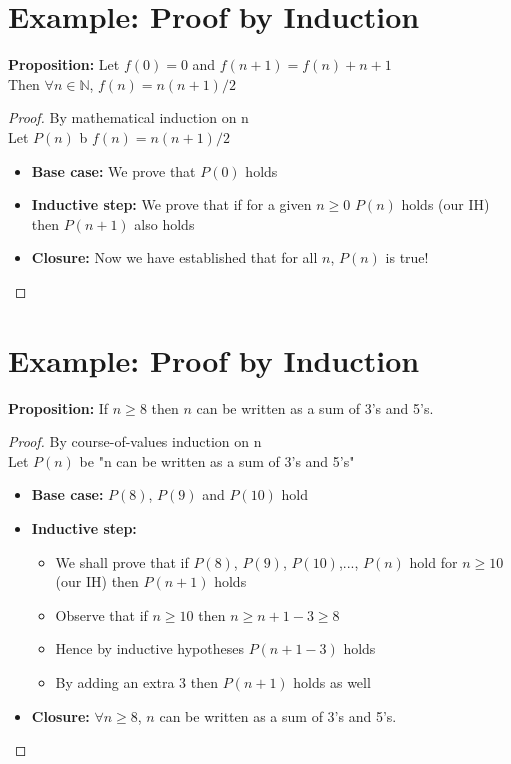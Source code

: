 \section{Example: Proof by Induction} %
\label{sec:example_proof_by_induction}
\textbf{Proposition:} Let $f(0) = 0$ and $f(n+1) = f(n) + n + 1$\\
Then $\forall n \in \mathbb{N}$, $f(n) = n(n+1)/2$
\begin{proof}
    By mathematical induction on n\\
    Let $P(n)$ b $f(n) = n(n + 1)/2$
    \begin{itemize}
        \item \textbf{Base case:} We prove that $P(0)$ holds
        \item \textbf{Inductive step:} We prove that if for a given $n \ge 0$ $P(n)$ holds (our IH) then $P(n + 1)$ also holds
        \item \textbf{Closure:} Now we have established that for all $n$, $P(n)$ is true!
    \end{itemize}
\end{proof}

\section{Example: Proof by Induction} %
\label{sec:example_proof_by_induction2}
\textbf{Proposition:} If $n \ge 8$ then $n$ can be written as a sum of 3's and 5's.
\begin{proof}
    By course-of-values induction on n\\
    Let $P(n)$ be "n can be written as a sum of 3's and 5's"
    \begin{itemize}
        \item \textbf{Base case:} $P(8)$, $P(9)$ and $P(10)$ hold
        \item \textbf{Inductive step:}
        \begin{itemize}
            \item We shall prove that if $P(8)$, $P(9)$, $P(10)$,..., $P(n)$ hold for $n \ge 10$ (our IH) then $P(n+1)$ holds
            \item Observe that if $n \ge 10$ then $n \ge n + 1 - 3 \ge 8$
            \item Hence by inductive hypotheses $P(n + 1 - 3)$ holds
            \item By adding an extra 3 then $P(n + 1)$ holds as well
        \end{itemize}
        \item \textbf{Closure:} $\forall n \ge 8$, $n$ can be written as a sum of 3's and 5's.
    \end{itemize}
\end{proof}

